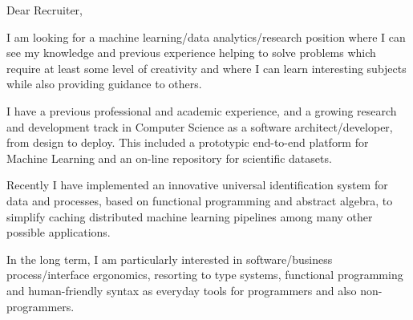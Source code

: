 \documentclass[letterpaper,11pt]{article}
\begin{document}
\vspace{40pt}

{\justifying
\Large
{}
Dear Recruiter,
\vspace{10pt}

% 

I am looking for a machine learning/data analytics/research position where I can see my knowledge and previous experience helping to solve problems which require at least some level of creativity and where I can learn interesting subjects while also providing guidance to others. %


I have a previous professional and academic experience, and a growing research and development track in Computer Science as a software architect/developer, from design to deploy.
This included a prototypic end-to-end platform for Machine Learning and an on-line repository for scientific datasets.

Recently I have implemented an innovative universal identification system for data and processes, based on functional programming and abstract algebra, to simplify caching distributed machine learning pipelines among  many other possible applications.

In the long term, I am particularly interested in software/business process/interface ergonomics, resorting to type systems, functional programming and human-friendly syntax as everyday tools for programmers and also non-programmers.

}
\end{document}
